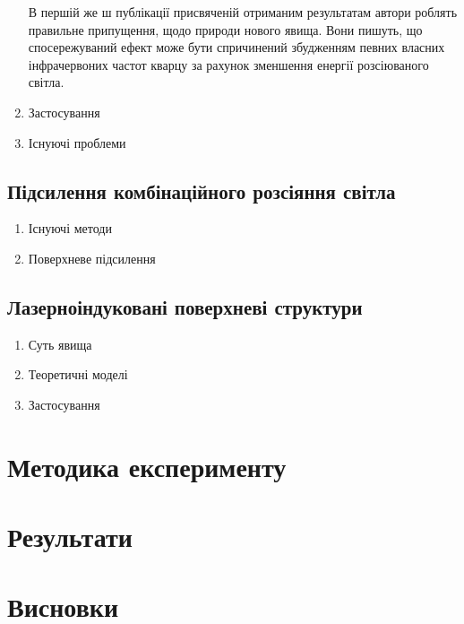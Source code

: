 \begin{enumerate}
                    В першій же ш публікації присвяченій отриманим результатам автори роблять правильне припущення, щодо природи нового явища. Вони
                    пишуть, що спосережуваний ефект може бути спричинений збудженням певних власних інфрачервоних частот кварцу за рахунок зменшення
                    енергії розсіюваного світла.
                \item{Застосування}
                \item{Існуючі проблеми}
            \end{enumerate}
        \subsection{Підсилення комбінаційного розсіяння світла}
            \begin{enumerate}
                \item{Існуючі методи}
                \item{Поверхневе підсилення}
            \end{enumerate}
        \subsection{Лазерноіндуковані поверхневі структури}
            \begin{enumerate}
                \item {Суть явища}
                \item {Теоретичні моделі}
                \item {Застосування}
            \end{enumerate}
    \section{Методика експерименту}
    \section{Результати}
    \section{Висновки}         
        
            

